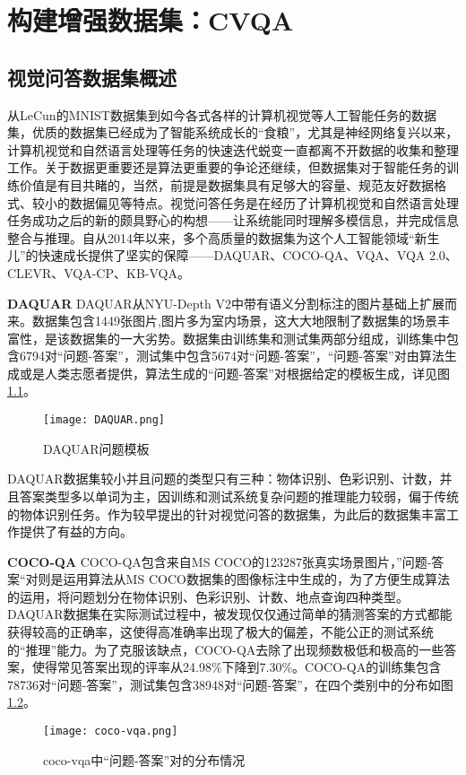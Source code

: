 \chapter{构建增强数据集：CVQA}
\section{视觉问答数据集概述}
从LeCun的MNIST数据集到如今各式各样的计算机视觉等人工智能任务的数据集，优质的数据集已经成为了智能系统成长的“食粮”，尤其是神经网络复兴以来，计算机视觉和自然语言处理等任务的快速迭代蜕变一直都离不开数据的收集和整理工作。关于数据更重要还是算法更重要的争论还继续，但数据集对于智能任务的训练价值是有目共睹的，当然，前提是数据集具有足够大的容量、规范友好数据格式、较小的数据偏见等特点。视觉问答任务是在经历了计算机视觉和自然语言处理任务成功之后的新的颇具野心的构想——让系统能同时理解多模信息，并完成信息整合与推理。自从2014年以来，多个高质量的数据集为这个人工智能领域“新生儿”的快速成长提供了坚实的保障——DAQUAR、COCO-QA、VQA、VQA 2.0、CLEVR、VQA-CP、KB-VQA。

\textbf{DAQUAR}
DAQUAR从NYU-Depth V2中带有语义分割标注的图片基础上扩展而来。数据集包含1449张图片,图片多为室内场景，这大大地限制了数据集的场景丰富性，是该数据集的一大劣势。数据集由训练集和测试集两部分组成，训练集中包含6794对“问题-答案”，测试集中包含5674对“问题-答案”，“问题-答案”对由算法生成或是人类志愿者提供，算法生成的“问题-答案”对根据给定的模板生成，详见图\ref{DAQUAR}。
\begin{figure}[H]
	\texttt{[image: DAQUAR.png]}
	\caption{DAQUAR问题模板}
	\label{DAQUAR}
\end{figure}

DAQUAR数据集较小并且问题的类型只有三种：物体识别、色彩识别、计数，并且答案类型多以单词为主，因训练和测试系统复杂问题的推理能力较弱，偏于传统的物体识别任务。作为较早提出的针对视觉问答的数据集，为此后的数据集丰富工作提供了有益的方向。

\textbf{COCO-QA}
COCO-QA包含来自MS COCO的123287张真实场景图片，”问题-答案“对则是运用算法从MS COCO数据集的图像标注中生成的，为了方便生成算法的运用，将问题划分在物体识别、色彩识别、计数、地点查询四种类型。DAQUAR数据集在实际测试过程中，被发现仅仅通过简单的猜测答案的方式都能获得较高的正确率，这使得高准确率出现了极大的偏差，不能公正的测试系统的“推理”能力。为了克服该缺点，COCO-QA去除了出现频数极低和极高的一些答案，使得常见答案出现的评率从24.98\%下降到7.30\%。COCO-QA的训练集包含78736对“问题-答案”，测试集包含38948对“问题-答案”，在四个类别中的分布如图\ref{coco-vqa}。
\begin{figure}[H]
	\centering
	\texttt{[image: coco-vqa.png]}
	\caption{coco-vqa中“问题-答案”对的分布情况}
	\label{coco-vqa}
\end{figure}

